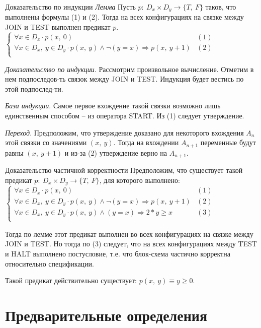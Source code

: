 \documentclass[hyperref={unicode=true}]{beamer}
\begin{document}
    \begin{frame}{Доказательство по индукции}
    \emph{Лемма} Пусть $p:~D_x \times D_y \rightarrow \{T,~F\}$ таков, что выполнены формулы (1) и (2). Тогда на всех конфигурациях на связке между JOIN и TEST выполнен предикат $p$.
    $\begin{cases}
    \forall x \in D_x \cdot p(x,~0) & (1)\\
    \forall x \in D_x,~y \in D_y \cdot p(x,~y) \land \neg (y = x) \Rightarrow p(x,~y + 1) & (2)\\
     \end{cases}$

    \emph{Доказательство по индукции}. Рассмотрим произвольное вычисление. Отметим в нем подпоследов-ть связок между JOIN и TEST. Индукция будет вестись по этой подпослед-ти.

    \emph{База индукции}. Самое первое вхождение такой связки возможно лишь единственным способом -- из оператора START. Из (1) следует утверждение.

    \emph{Переход}. Предположим, что утверждение доказано для некоторого вхождения $A_n$ этой связки со значениями $(x,~y)$. Тогда на вхождении $A_{n+1}$ переменные будут равны $(x,~y+1)$ и из-за (2) утверждение верно на $A_{n+1}$.
    \end{frame}

    \begin{frame}{Доказательство частичной корректности}
    Предположим, что существует такой предикат $p:~D_x \times D_y \rightarrow \{T,~F\}$, для которого выполнено:
    $\begin{cases}
    \forall x \in D_x \cdot p(x,~0) & (1)\\
    \forall x \in D_x,~y \in D_y \cdot p(x,~y) \land \neg (y = x) \Rightarrow p(x,~y + 1) & (2)\\
    \forall x \in D_x,~y \in D_y \cdot p(x,~y) \land (y = x) \Rightarrow 2 * y \geq x & (3) \\
     \end{cases}$

    Тогда по лемме этот предикат выполнен во всех конфигурациях на связке между JOIN и TEST. Но тогда по (3) следует, что на всех конфигурациях между TEST и HALT выполнено постусловие, т.е. что блок-схема частично корректна относительно спецификации.

    Такой предикат действительно существует: $p(x,~y)\equiv y \geq 0$.
    \end{frame}

    \section{Предварительные определения}
\end{document}
